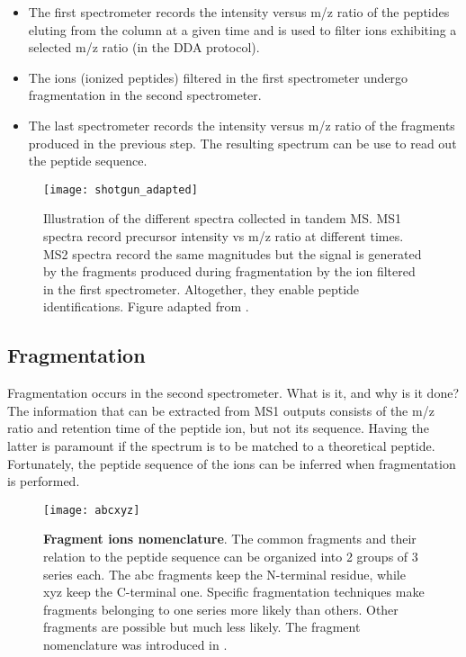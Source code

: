 \begin{itemize}

\item The first spectrometer records the intensity versus \ac{m/z} ratio of the peptides eluting from the column at a given time and is used to filter ions exhibiting a selected \ac{m/z} ratio (in the \ac{DDA} protocol).

\item The ions (ionized peptides) filtered in the first spectrometer undergo fragmentation in the second spectrometer. %

\item The last spectrometer records the intensity versus \ac{m/z} ratio of the fragments produced in the previous step. The resulting spectrum can be use to read out the peptide sequence.

\end{itemize}

\begin{figure}[!h]
\centering
\texttt{[image: shotgun\_adapted]}
\caption[MS/MS spectra]{Illustration of the different spectra collected in tandem MS. MS1 spectra record precursor intensity vs \ac{m/z} ratio at different times. MS2 spectra record the same magnitudes but the signal is generated by the fragments produced during fragmentation by the ion filtered in the first spectrometer. Altogether, they enable peptide identifications. Figure adapted from \cite{Verheggen2017}.}
\label{fig:shotgun}
\end{figure}

\subsection{Fragmentation}
\label{subsec:fragmentation}

Fragmentation occurs in the second spectrometer. What is it, and why is it done? The information that can be extracted from \ac{MS1} outputs consists of the \ac{m/z} ratio and retention time of the peptide ion, but not its sequence. Having the latter is paramount if the spectrum is to be matched to a theoretical peptide. Fortunately, the peptide sequence of the ions can be inferred when fragmentation is performed.

\begin{figure}[!h]
\centering
\texttt{[image: abcxyz]}
\caption[Fragment ions nomenclature]{\textbf{Fragment ions nomenclature}. The common fragments and their relation to the peptide sequence can be organized into 2 groups of 3 series each. The abc fragments keep the N-terminal residue, while xyz keep the C-terminal one. Specific fragmentation techniques make fragments belonging to one series more likely than others. Other fragments are possible but much less likely. The fragment nomenclature was introduced in \cite{Roepstorff1984}.}
\label{fig:abcxyz}
\end{figure}


